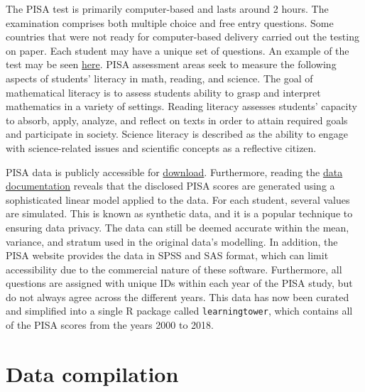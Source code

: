The PISA test is primarily computer-based and lasts around 2 hours. The
examination comprises both multiple choice and free entry questions.
Some countries that were not ready for computer-based delivery carried
out the testing on paper. Each student may have a unique set of
questions. An example of the test may be seen
\href{https://www.oecd.org/pisa/test/}{here}. PISA assessment areas seek
to measure the following aspects of students' literacy in math, reading,
and science. The goal of mathematical literacy is to assess students
ability to grasp and interpret mathematics in a variety of settings.
Reading literacy assesses students' capacity to absorb, apply, analyze,
and reflect on texts in order to attain required goals and participate
in society. Science literacy is described as the ability to engage with
science-related issues and scientific concepts as a reflective citizen.
\citep{test}

PISA data is publicly accessible for
\href{https://www.oecd.org/pisa/data/}{download}. Furthermore, reading
the
\href{https://www.oecd.org/pisa/data/pisa2018technicalreport/Ch.09-Scaling-PISA-Data.pdf}{data
documentation} reveals that the disclosed PISA scores are generated
using a sophisticated linear model applied to the data. For each
student, several values are simulated. \citep{scaling} This is known as
synthetic data, and it is a popular technique to ensuring data privacy.
The data can still be deemed accurate within the mean, variance, and
stratum used in the original data's modelling. In addition, the PISA
website provides the data in SPSS and SAS format, which can limit
accessibility due to the commercial nature of these software.
Furthermore, all questions are assigned with unique IDs within each year
of the PISA study, but do not always agree across the different years.
This data has now been curated and simplified into a single R package
called \texttt{learningtower}, which contains all of the PISA scores
from the years 2000 to 2018.

\hypertarget{data-compilation}{%
\section{Data compilation}\label{data-compilation}}

